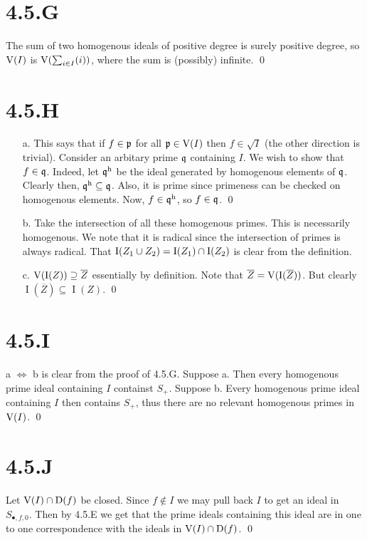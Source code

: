 \documentclass{article}
\begin{document}
\section{4.5.G}
The sum of two homogenous ideals of positive degree is surely positive degree,
so $\operatorname{V}(I)$ is $\operatorname{V}(\sum_{i \in I} (i))$, where the sum is
(possibly) infinite. \qed

\section{4.5.H}
\begin{itemize}
      \item[a.] This says that if $f \in \mathfrak{p}$ for all $\mathfrak{p} \in \operatorname{V}(I)$
            then $f \in \sqrt{I}$ (the other direction is trivial). Consider an
            arbitary prime $\mathfrak{q}$ containing $I$. We
            wish to show that $f \in \mathfrak{q}$. Indeed, let $\mathfrak{q}^{\text{h}}$
            be the ideal generated by homogenous elements of $\mathfrak{q}$.
            Clearly then, $\mathfrak{q}^{\text{h}} \subseteq \mathfrak{q}$. Also, it is prime since primeness can be
            checked on homogenous elements. Now, $f \in \mathfrak{q}^{\text{h}}$, so
            $f \in \mathfrak{q}$. \qed
      \item[b.] Take the intersection of all these homogenous primes. This is necessarily
            homogenous. We note that it is radical since the intersection of primes is
            always radical. That $\operatorname{I}(Z_1 \cup Z_2) = \operatorname{I}(Z_1) \cap
                  \operatorname{I}(Z_2)$ is clear from the definition.
      \item[c.] $\operatorname{V}(\operatorname{I}(Z)) \supseteq \overline{Z}$ essentially by definition. Note that
            $\overline{Z}=\operatorname{V}(\operatorname{I}(\overline{Z}))$. But clearly $\operatorname{I}(\overline{Z}) \subseteq \operatorname{I}(Z)$. \qed
\end{itemize}

\section{4.5.I}
a $\iff$ b is clear from the proof of 4.5.G. Suppose a. Then
every homogenous prime ideal containing $I$ containst
$S_+$. Suppose b. Every homogenous prime ideal containing
$I$ then contains $S_+$, thus there are
no relevant homogenous primes in $\operatorname{V}(I)$. \qed

\section{4.5.J}
Let $\operatorname{V}(I) \cap \operatorname{D}(f)$ be closed. Since $f \notin I$ we may
pull back $I$ to get an ideal in $S_{\bullet, f, 0}$.
Then by 4.5.E we get that the prime ideals containing this ideal are in one to
one correspondence with the ideals in $\operatorname{V}(I) \cap \operatorname{D}(f)$. \qed
\end{document}
